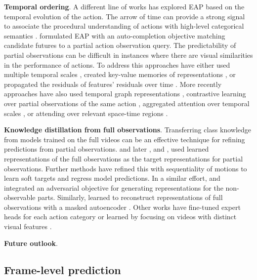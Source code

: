 \documentclass[smallextended,twocolumn,natbib]{svjour3}
\begin{document}
\noindent
\textbf{Temporal ordering}. A different line of works has explored EAP based on the temporal evolution of the action. The arrow of time \citep{pickup2014seeing} can provide a strong signal to associate the procedural understanding of actions with high-level categorical semantics \citep{misra2016shuffle,zhou2015temporal}. \citet{xu2015activity} formulated EAP with an auto-completion objective matching candidate futures to a partial action observation query. The predictability of partial observations can be difficult in instances where there are visual similarities in the performance of actions. To address this approaches have either used multiple temporal scales \citep{kong2014discriminative}, created key-value memories of representations \citep{kong2018action}, or propagated the residuals of features' residuals over time \citep{zhao2019spatiotemporal}. More recently approaches have also used temporal graph representations \citep{wu2021spatial,wu2021anticipating}, contrastive learning over partial observations of the same action \citep{wang2023magi}, aggregated attention over temporal scales \citep{stergiou2023wisdom}, or attending over relevant space-time regions \citep{rangrej2023glitr}.


\noindent
\textbf{Knowledge distillation from full observations}. Transferring class knowledge \citep{park2019relational} from models trained on the full videos can be an effective technique for refining predictions from partial observations. \citet{cai2019action} and later \citet{fernando2021anticipating}, and \citet{wang2019progressive}, used learned representations of the full observations as the target representations for partial observations. Further methods \citep{hou2020confidence} have refined this with sequentiality of motions to learn soft targets and regress model predictions. In a similar effort, \citep{xu2019prediction} and \citep{zheng2023egocentric} integrated an adversarial objective for generating representations for the non-observable parts. Similarly, \citet{xu2023dynamic} learned to reconstruct representations of full observations with a masked autoencoder \citep{he2022masked}. Other works have fine-tuned expert heads for each action category \citep{foo2022era} or learned by focusing on videos with distinct visual features \citep{hu2018early}.

\noindent
\textbf{Future outlook}.








\subsection{Frame-level prediction}
\end{document}

